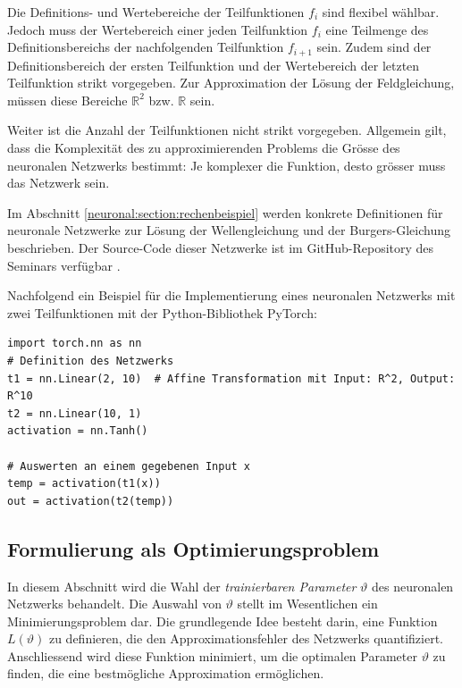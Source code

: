 Die Definitions- und Wertebereiche der Teilfunktionen \( f_i \) sind flexibel wählbar. 
Jedoch muss der Wertebereich einer jeden Teilfunktion \( f_i \) eine Teilmenge des Definitionsbereichs der nachfolgenden Teilfunktion \( f_{i+1} \) sein.
Zudem sind der Definitionsbereich der ersten Teilfunktion und der Wertebereich der letzten Teilfunktion strikt vorgegeben. 
Zur Approximation der Lösung der Feldgleichung, müssen diese Bereiche \( \mathbb{R}^2 \) bzw. \( \mathbb{R} \) sein.

Weiter ist die Anzahl der Teilfunktionen nicht strikt vorgegeben. 
Allgemein gilt, dass die Komplexität des zu approximierenden Problems die Grösse des neuronalen Netzwerks bestimmt: Je komplexer die Funktion, desto grösser muss das Netzwerk sein.

Im Abschnitt \ref{neuronal:section:rechenbeispiel} werden konkrete Definitionen für neuronale Netzwerke zur Lösung der Wellengleichung und der Burgers-Gleichung beschrieben.
Der Source-Code dieser Netzwerke ist im GitHub-Repository des Seminars verfügbar \cite{neuronal:github_source_code}.

Nachfolgend ein Beispiel für die Implementierung eines neuronalen Netzwerks mit zwei Teilfunktionen mit der Python-Bibliothek PyTorch:
%
%

\begin{lstlisting}
import torch.nn as nn
# Definition des Netzwerks
t1 = nn.Linear(2, 10)  # Affine Transformation mit Input: R^2, Output: R^10
t2 = nn.Linear(10, 1)
activation = nn.Tanh()

# Auswerten an einem gegebenen Input x
temp = activation(t1(x))
out = activation(t2(temp))
\end{lstlisting}

\subsection{Formulierung als Optimierungsproblem}\label{neuronal:subsection:optimierungsproblem}
In diesem Abschnitt wird die Wahl der \emph{trainierbaren Parameter} $\vartheta$ des neuronalen Netzwerks behandelt.
Die Auswahl von $\vartheta$ stellt im Wesentlichen ein Minimierungsproblem dar.
Die grundlegende Idee besteht darin, eine Funktion \( L(\vartheta) \) zu definieren, die den Approximationsfehler des Netzwerks quantifiziert.
Anschliessend wird diese Funktion minimiert, um die optimalen Parameter $\vartheta$ zu finden, die eine bestmögliche Approximation ermöglichen.

